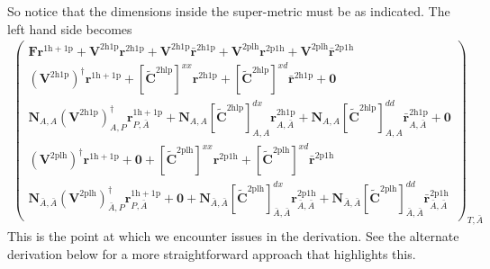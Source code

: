 So notice that the dimensions inside the super-metric must be as indicated. The left hand side becomes
\begin{align}
    \begin{pmatrix}
\bm{F}\bm{r}^{1\mathrm{h}+1\mathrm{p}} + \bm{V}^{2\mathrm{h}1\mathrm{p}}\bm{r}^{2\mathrm{h}1\mathrm{p}} + \bm{V}^{2\mathrm{h}1\mathrm{p}}\bm{\bar{r}}^{2\mathrm{h}1\mathrm{p}} + \bm{V}^{2\mathrm{plh}}\bm{r}^{2\mathrm{p}1\mathrm{h}} + \bm{V}^{2\mathrm{plh}}\bm{\bar{r}}^{2\mathrm{p}1\mathrm{h}} \\
\left(\bm{V}^{2\mathrm{h1p}}\right)^{\dagger} \bm{r}^{1\mathrm{h}+1\mathrm{p}} + [\bm{\tilde{C}}^{2\mathrm{hlp}}]^{xx} \bm{r}^{2\mathrm{h}1\mathrm{p}} + [\bm{\tilde{C}}^{2\mathrm{hlp}}]^{xd} \bm{\bar{r}}^{2\mathrm{h}1\mathrm{p}} + \bm{0} \\
\bm{N}_{A,A}\left(\bm{V}^{2\mathrm{h1p}}\right)^{\dagger}_{A,P} \bm{r}^{1\mathrm{h}+1\mathrm{p}}_{P,\bar{A}} + \bm{N}_{A,A}[\bm{\tilde{C}}^{2\mathrm{hlp}}]^{dx}_{A,A} \bm{r}^{2\mathrm{h}1\mathrm{p}}_{A,\bar{A}} + \bm{N}_{A,A}[\bm{\tilde{C}}^{2\mathrm{hlp}}]^{dd}_{A,A} \bm{\bar{r}}^{2\mathrm{h}1\mathrm{p}}_{A,\bar{A}} + \bm{0} \\
\left(\bm{V}^{2\mathrm{plh}}\right)^{\dagger} \bm{r}^{1\mathrm{h}+1\mathrm{p}} + \bm{0} + [\bm{\tilde{C}}^{2\mathrm{plh}}]^{xx} \bm{r}^{2\mathrm{p}1\mathrm{h}} + [\bm{\tilde{C}}^{2\mathrm{plh}}]^{xd} \bm{\bar{r}}^{2\mathrm{p}1\mathrm{h}} \\
\bm{N}_{\bar{A}, \bar{A}}\left(\bm{V}^{2\mathrm{plh}}\right)^{\dagger}_{\bar{A},P} \bm{r}^{1\mathrm{h}+1\mathrm{p}}_{P,\bar{A}} + \bm{0} + \bm{N}_{\bar{A}, \bar{A}}[\bm{\tilde{C}}^{2\mathrm{plh}}]^{dx}_{\bar{A},\bar{A}} \bm{r}^{2\mathrm{p}1\mathrm{h}}_{\bar{A},\bar{A}} + \bm{N}_{\bar{A}, \bar{A}}[\bm{\tilde{C}}^{2\mathrm{plh}}]^{dd}_{\bar{A},\bar{A}} \bm{\bar{r}}^{2\mathrm{p}1\mathrm{h}}_{\bar{A},\bar{A}}
\end{pmatrix}_{T,\bar{A}}
\end{align}
This is the point at which we encounter issues in the derivation. See the alternate derivation below for a more straightforward approach that highlights this.
